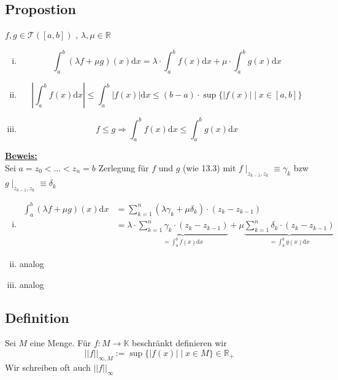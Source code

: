\subsection{Propostion} %
\label{sub:propostion}
$f,g \in \mathcal{T} ([a,b])$ , $\lambda , \mu \in \mathds{R}$
\begin{enumerate}[(i)]
	\item \[
		\int_{a} ^{b} (\lambda f + \mu g)(x) \mathrm{d} x = \lambda \cdot \int_{a} ^{b} f(x) \mathrm{d}x + \mu \cdot \int_{a} ^{b} g(x)\mathrm{d}x
	\]
	\item 
	\[
		\left| \int_{a} ^{b} f(x)\mathrm{d}x \right| \le \int_{a} ^{b} |f(x)| \mathrm{d} x \le (b-a) \cdot \sup \Big\{ |f(x)| \mid x \in [a,b] \Big\}
	\]
	\item \[
		f \le g \Rightarrow \int_{a} ^{b} f(x)\mathrm{d}x \le \int_{a} ^{b} g(x) \mathrm{d}x
	\]
\end{enumerate}
\underline{\textbf{Beweis:}} \\
Sei $a= z_0 < \ldots  < z_n= b$ Zerlegung für $f$ und $g$ (wie 13.3) mit $f \mid_{z_{k-1}, z_k} \equiv \gamma_k$ bzw $g \mid_{z_{k-1}, z_k} \equiv \delta_k$
\begin{enumerate}[(i)]
	\item \begin{align*}
		\int_{a} ^{b} (\lambda f + \mu g)(x) \mathrm{d} x &= \sum\limits_{k=1}^{n} (\lambda \gamma_k + \mu \delta_k) \cdot (z_k - z_{k-1}) \\
		&= \lambda \cdot \underbrace{\sum\limits_{k=1}^{n} \gamma_k \cdot (z_k - z_{k-1})}_{ = \int_{a} ^{b} f(x)  \mathrm{d} x } + 
		\mu \underbrace{\sum\limits_{k=1}^{n} \delta_k \cdot (z_k - z_{k-1})}_{ =\int_{a} ^{b} g(x)  \mathrm{d} x }  
	\end{align*}
	\item analog
	\item analog
\end{enumerate}

\subsection{Definition} %
\label{sub:definition}
Sei $M$ eine Menge. Für $f : M \to \mathds{K}$ beschränkt definieren wir 
\[
	|| f||_{\infty, M} := \sup \Big\{ |f(x)| \mid x \in M  \Big\} \in \mathds{R}_+
\]
Wir schreiben oft auch $||f||_{\infty}$


